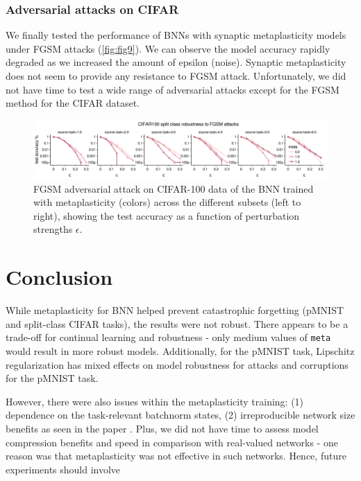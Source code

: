 \documentclass[manuscript,screen,review=false, nonacm]{acmart}
\begin{document}
\subsubsection{Adversarial attacks on CIFAR}

We finally tested the performance of BNNs with synaptic metaplasticity models under FGSM attacks (\autoref{fig:fig9}). We can observe the model accuracy rapidly degraded as we increased the amount of epsilon (noise). Synaptic metaplasticity does not seem to provide any resistance to FGSM attack. Unfortunately, we did not have time to test a wide range of adversarial attacks except for the FGSM method for the CIFAR dataset.


\begin{figure}[ht]
    \centering
    \includegraphics[width=1.1\textwidth]{figures/report/Fig9.pdf}
    \caption{
    FGSM adversarial attack on CIFAR-100 data of the BNN trained with metaplasticity (colors) across the different subsets (left to right), showing the test accuracy as a function of perturbation strengths $\epsilon$.
    }
    \label{fig:fig9}
\end{figure}

\section{Conclusion}

While metaplasticity for BNN helped prevent catastrophic forgetting (pMNIST and split-class CIFAR tasks), the results were not robust. There appears to be a trade-off for continual learning and robustness - only medium values of \texttt{meta} would result in more robust models. Additionally, for the pMNIST task, Lipschitz regularization has mixed effects on model robustness for attacks and corruptions for the pMNIST task.
    
However, there were also issues within the metaplasticity training: (1) dependence on the task-relevant batchnorm states, (2) irreproducible network size benefits as seen in the paper \cite{Laborieux_Ernoult_Hirtzlin_Querlioz_2021}. Plus, we did not have time to assess model compression benefits and speed in comparison with real-valued networks - one reason was that metaplasticity was not effective in such networks. Hence, future experiments should involve 
\end{document}
